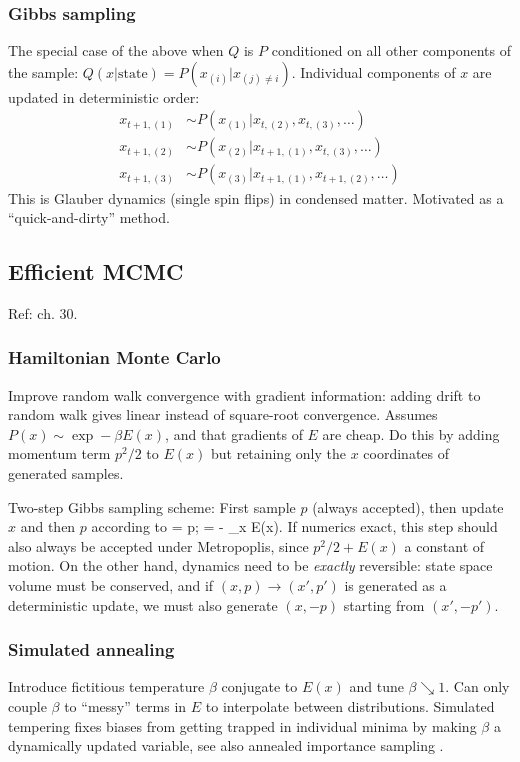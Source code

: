 \documentclass[notitlepage,openany,11pt]{report}
\numberwithin{equation}{section}
\theoremstyle{plain}%
\begin{document}
\subsubsection{Gibbs sampling} The special case of the above when $Q$ is $P$ conditioned on all other components of the sample: $Q(x | \text{state}) = P(x_{(i)} | x_{(j) \neq i})$. Individual components of $x$ are updated in deterministic order:
\begin{align*}
x_{t+1, (1)} &\sim P(x_{(1)} | x_{t, (2)}, x_{t, (3)}, \ldots) \\
x_{t+1, (2)} &\sim P(x_{(2)} | x_{t+1, (1)}, x_{t, (3)}, \ldots) \\
x_{t+1, (3)} &\sim P(x_{(3)} | x_{t+1, (1)}, x_{t+1, (2)}, \ldots)
\end{align*}
This is Glauber dynamics (single spin flips) in condensed matter. Motivated as a ``quick-and-dirty'' method.

\subsection{Efficient MCMC} Ref: \cite{MacKay:03} ch. 30.

\subsubsection{Hamiltonian Monte Carlo} Improve random walk convergence with gradient information: adding drift to random walk gives linear instead of square-root convergence. Assumes $P(x) \sim \exp -\beta E(x)$, and that gradients of $E$ are cheap. Do this by adding momentum term $p^{2}/2$ to $E(x)$ but retaining only the $x$ coordinates of generated samples. 

Two-step Gibbs sampling scheme: First sample $p$ (always accepted), then update $x$ and then $p$ according to
\be
{} = p; \qquad {} = - \partial_{x} E(x).
\ee
If numerics exact, this step should also always be accepted under Metropoplis, since $p^{2}/2 + E(x)$ a constant of motion.  On the other hand, dynamics need to be \textit{exactly} reversible: state space volume must be conserved, and if $(x,p) \to (x',p')$ is generated as a deterministic update, we must also generate $(x, -p)$ starting from $(x', -p')$.

\subsubsection{Simulated annealing} Introduce fictitious temperature $\beta$ conjugate to $E(x)$ and tune $\beta \searrow 1$. Can only couple $\beta$ to ``messy'' terms in $E$ to interpolate between distributions. Simulated tempering \cite{MarinariParisi:92} fixes biases from getting trapped in individual minima by making $\beta$ a dynamically updated variable, see also annealed importance sampling \cite{Neal:01}.
\end{document}
